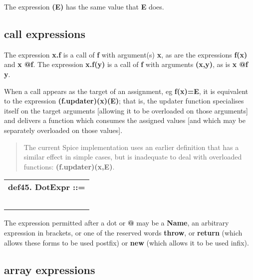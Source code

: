 \documentclass{report}
\begin{document}
The expression {\bf (E)} has the same value that {\bf E} does.

\subsection{call expressions}


The expression {\bf x.f} is a call of {\bf f} with argument(s) {\bf x}, as are the
expressions {\bf f(x)} and {\bf x @f}. The expression {\bf x.f(y)} is a call of
{\bf f} with arguments {\bf (x,y)}, as is {\bf x @f y}.

When a call appears as the target of an assignment, eg {\bf f(x)=E}, it is
equivalent to the expression {\bf (f.updater)(x)(E)}; that is, the updater
function specialises itself on the target arguments {[}allowing it to
be overloaded on those arguments{]} and delivers a function which consumes
the assigned values {[}and which may be separately overloaded on those values{]}.

\begin{quote}The current Spice implementation uses an earlier definition that has
a similar effect in simple cases, but is inadequate to deal with
overloaded functions: {\bf (f.updater)(x,E)}.\end{quote}

\begin{tabular}{l}
{\bf def45. DotExpr ::= }\\ 
\hspace*{3mm}{\tt Name} \\ 
\hspace*{3mm}{\tt  $\mid$ "(" Expr ")"} \\ 
\hspace*{3mm}{\tt  $\mid$ "return"} \\ 
\hspace*{3mm}{\tt  $\mid$ "throw"} \\ 
\hspace*{3mm}{\tt  $\mid$ "new"} \\ 
\end{tabular}



The expression permitted after a dot or {\bf @} may be a {\bf Name}, an arbitrary
expression in brackets, or one of the reserved words {\bf throw}, or
{\bf return} (which allows these forms to be used postfix) or {\bf new} (which
allows it to be used infix).

\subsection{array expressions}
\end{document}
